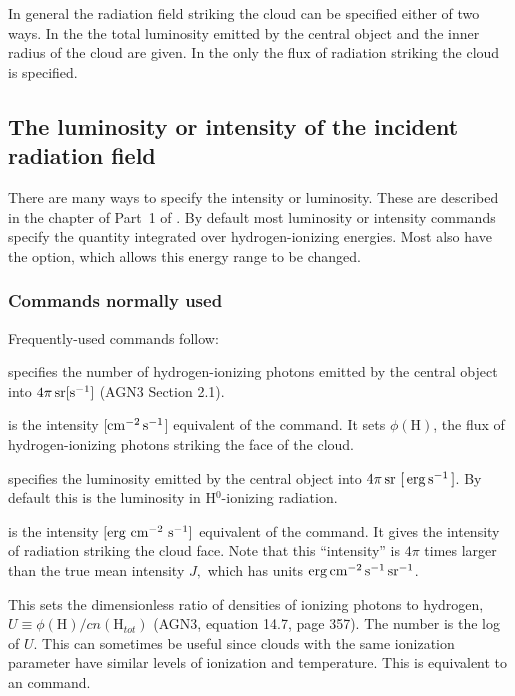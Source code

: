 \documentclass[12pt,twoside]{article}
\begin{document}
In general the radiation field striking the cloud can be specified either
of two ways.
In the 
the total luminosity emitted by the
central object and the inner radius of the
cloud are given.
In the  only the flux of radiation striking
the cloud is specified.

\subsection{The luminosity or intensity of the incident radiation field}

There are many ways to specify the intensity or luminosity.
These are described
in the chapter  of Part~1 of \Hazy.
By default most
luminosity or intensity commands specify the quantity integrated over
hydrogen-ionizing energies.  Most also have
the  option, which allows
this energy range to be changed.

\subsubsection{Commands normally used}

Frequently-used commands follow:

 specifies the number of
hydrogen-ionizing photons emitted by the
central object into $4\pi\,\rm{sr} \rm{[s^{-1}]}$ (AGN3 Section 2.1).

 is the intensity
[$\rm{cm^{-2}\, s^{-1}}$] equivalent of the  command.
It sets $\phi(\mathrm{H})$,
the flux of hydrogen-ionizing photons striking the face of the cloud.

 specifies the luminosity
emitted by the central object into
$4\pi {\rm\thinspace sr}\ [\mbox{${\rm\thinspace erg}{\rm\thinspace s}^{-1}\,$} ]$.  By default this
is the luminosity in H$^0$-ionizing radiation.

 is the intensity
$[\rm{erg} \ \rm{cm}^{-2} \ \rm{s}^{-1}]$
equivalent of the 
command.  It gives the intensity of radiation striking the cloud face.
Note that this ``intensity'' is $4\pi$ times
larger than the true mean intensity
$J,$ which has units $\rm{erg\, cm^{-2}\, s^{-1}\, sr^{-1}}$.

\quad  This
sets the dimensionless ratio of densities
of ionizing photons to hydrogen, $U\equiv
\phi(\mathrm{H})/cn(\mathrm{H}_\mathit{tot})$
(AGN3, equation 14.7, page 357).  The number is the log of $U$.  This
can sometimes be useful since clouds with the same ionization parameter
have similar levels of ionization and temperature.  This is equivalent to
an  command.
\end{document}
